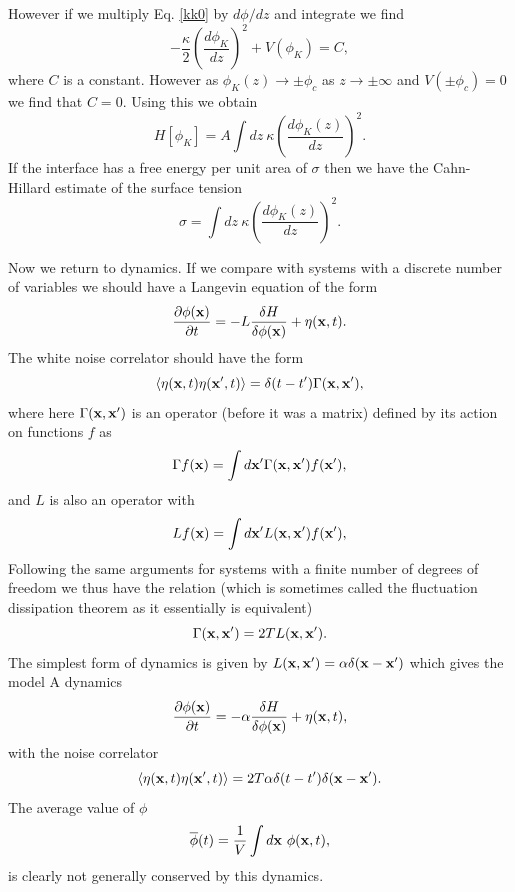 However if we multiply Eq. \eqref{kk0} by $d\phi/dz$ and integrate we find
\begin{equation}
-\frac{\kappa}{2} (\frac{d\phi_K}{dz})^2 + V(\phi_K) = C,
\end{equation}
where $C$ is a constant. However as $\phi_K(z)\to \pm \phi_c$ as $z\to \pm \infty$ and $V(\pm\phi_c) =0$ we find that $C=0$. Using this we obtain 
\begin{equation}
H[\phi_K]=  A\int dz\  {\kappa}\left(\frac{d\phi_K(z)}{dz}\right)^2 .
\end{equation}
If the interface has a free energy per unit area of $\sigma$ then we have the Cahn-Hillard estimate of the surface tension 
\begin{equation}
\sigma=  \int dz\  {\kappa}\left(\frac{d\phi_K(z)}{dz}\right)^2 .\label{CHST}
\end{equation}

Now we return to dynamics. If we compare with systems with a discrete number of variables we
should have a Langevin equation of the form
\begin{equation}
\frac{\partial \phi({\bf x})}{\partial t}= -L \frac{\delta H}{\delta \phi({\bf x})} + \eta({\bf x},t).
\end{equation}
The white noise correlator should have the form
\begin{equation}
\langle \eta({\bf x},t)\eta({\bf x}',t)\rangle =\delta(t-t')\Gamma({\bf x},{\bf x'}),
\end{equation}
where here  $\Gamma({\bf x},{\bf x'})$ is an operator (before it was a matrix) defined by its action on functions $f$ as
\begin{equation}
\Gamma f({\bf x}) = \int d{\bf x}' \Gamma({\bf x},{\bf x}')f({\bf x}'),
\end{equation}
and $L$ is also an operator with 
\begin{equation}
L f({\bf x}) = \int d{\bf x}' L({\bf x},{\bf x}')f({\bf x}'),
\end{equation}
Following the same arguments for systems with a finite number of degrees of freedom we thus have the relation (which is sometimes called the fluctuation dissipation theorem as it essentially is equivalent)
\begin{equation} 
\Gamma({\bf x},{\bf x}') =2T L({\bf x},{\bf x}').\label{gnoise}
\end{equation}
The simplest form of dynamics is given by $L({\bf x},{\bf x}')=\alpha\delta({\bf x}-{\bf x}')$ which gives the model A dynamics
\begin{equation}
\frac{\partial \phi({\bf x})}{\partial t}= -\alpha \frac{\delta H}{\delta \phi({\bf x})} + \eta({\bf x},t),\label{MA}
\end{equation}
with the noise correlator
\begin{equation}
\langle \eta({\bf x},t)\eta({\bf x}',t)\rangle =2T \alpha \delta(t-t')\delta({\bf x}-{\bf x'}).
\end{equation}
The average value of $\phi$ 
\begin{equation}
\overline \phi(t) = \frac{1}{V}\int d{\bf x}\  \phi({\bf x},t),
\end{equation}
is clearly not generally conserved by this dynamics.


